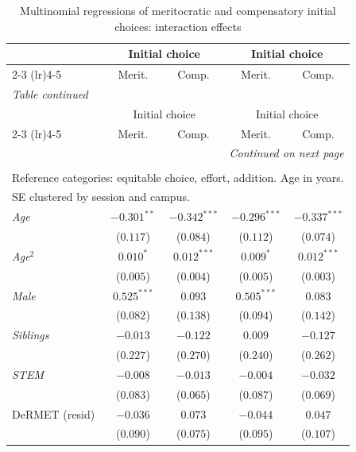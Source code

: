 \begin{footnotesize}
\begin{longtable}{l cc cc}
\caption{Multinomial regressions of meritocratic and compensatory initial choices: interaction effects} \label{table-b9-initial} \\
\toprule
 & \multicolumn{2}{c}{Initial choice} & \multicolumn{2}{c}{Initial choice} \\
\cmidrule(lr){2-3} \cmidrule(lr){4-5}
 & Merit. & Comp. & Merit. & Comp. \\
\midrule
\endfirsthead
\multicolumn{5}{l}{\textit{Table \thetable{} continued}} \\
\toprule
 & \multicolumn{2}{c}{Initial choice} & \multicolumn{2}{c}{Initial choice} \\
\cmidrule(lr){2-3} \cmidrule(lr){4-5}
 & Merit. & Comp. & Merit. & Comp. \\
\midrule
\endhead
\midrule
\multicolumn{5}{r}{\textit{Continued on next page}} \\
\endfoot
\bottomrule
\multicolumn{5}{l}{\footnotesize $^{***}p<0.01$; $^{**}p<0.05$; $^{*}p<0.1$.} \\
\multicolumn{5}{l}{\footnotesize Reference categories: equitable choice, effort, addition. Age in years.} \\
\multicolumn{5}{l}{\footnotesize SE clustered by session and campus.} \\
\endlastfoot
\textit{Age} & $-0.301^{**}$ & $-0.342^{***}$ & $-0.296^{***}$ & $-0.337^{***}$ \\
    & ($0.117$) & ($0.084$) & ($0.112$) & ($0.074$) \\
\textit{Age}$^2$ & $0.010^{*}$ & $0.012^{***}$ & $0.009^{*}$ & $0.012^{***}$ \\
    & ($0.005$) & ($0.004$) & ($0.005$) & ($0.003$) \\
\textit{Male} & $0.525^{***}$ & $0.093$ & $0.505^{***}$ & $0.083$ \\
    & ($0.082$) & ($0.138$) & ($0.094$) & ($0.142$) \\
\textit{Siblings} & $-0.013$ & $-0.122$ & $0.009$ & $-0.127$ \\
    & ($0.227$) & ($0.270$) & ($0.240$) & ($0.262$) \\
\textit{STEM} & $-0.008$ & $-0.013$ & $-0.004$ & $-0.032$ \\
    & ($0.083$) & ($0.065$) & ($0.087$) & ($0.069$) \\
DeRMET (resid) & $-0.036$ & $0.073$ & $-0.044$ & $0.047$ \\
    & ($0.090$) & ($0.075$) & ($0.095$) & ($0.107$) \\

\end{longtable}
\end{footnotesize}
